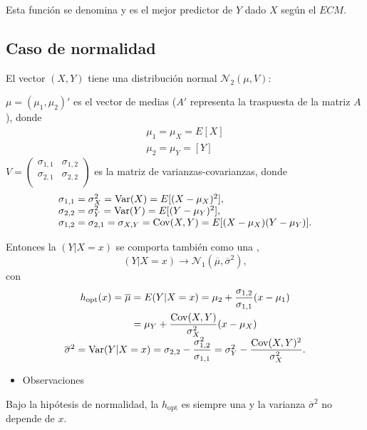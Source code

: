 Esta función se denomina  y es el mejor predictor de $Y$ dado $X$ según el $ECM$.
\subsection{Caso de normalidad}
El vector $(X,Y)$ tiene una distribución normal $\mathcal{N}_2(\mu,V)$:

$\mu=(\mu_1,\mu_2)'$ es el vector de medias ($A'$ representa la traspuesta de la matriz $A$), donde \[ \begin{array}{l}
\mu_1=\mu_X=E[X]\\
\mu_2=\mu_Y=[Y]
\end{array} \]
$V=\begin{pmatrix}
\sigma_{1,1} & \sigma_{1,2}\\
\sigma_{2,1} & \sigma_{2,2}\\
\end{pmatrix}$ es la matriz de varianzas-covarianzas, donde \[ \begin{array}{l}
\sigma_{1,1}=\sigma_X^2=\operatorname{Var}(X)=E[(X-\mu_X)^2],\\
\sigma_{2,2}=\sigma_Y^2=\operatorname{Var}(Y)=E[(Y-\mu_Y)^2],\\
\sigma_{1,2}=\sigma_{2,1}=\sigma_{X,Y}=\operatorname{Cov}(X,Y)=E[(X-\mu_X)(Y-\mu_Y)].
\end{array} \]

Entonces la  $(Y|X=x)$ se comporta también como una , \[ (Y|X=x)\longrightarrow \mathcal{N}_1(\overline{\mu},\overline{\sigma}^2), \] con \[ \begin{array}{c}
\begin{aligned}
h_{\mathrm{opt}}(x)=\overline{\mu}&=E(Y|X=x)=\mu_2+\dfrac{\sigma_{1,2}}{\sigma_{1,1}}(x-\mu_1)\\
&=\mu_Y+\dfrac{\operatorname{Cov}(X,Y)}{\sigma_X^2}(x-\mu_X)
\end{aligned}\\
\overline{\sigma}^2=\operatorname{Var}(Y|X=x)=\sigma_{2,2}-\dfrac{\sigma_{1,2}^2}{\sigma_{1,1}}=\sigma_Y^2-\dfrac{\operatorname{Cov}(X,Y)^2}{\sigma_X^2}.
\end{array} \]

\begin{itemize}[label=\color{red}\textbullet, leftmargin=*]
	\item \color{lightblue}Observaciones
\end{itemize}
Bajo la hipótesis de normalidad, la  $h_{\mathrm{opt}}$ es siempre una  y la varianza $\overline{\sigma}^2$ no depende de $x$.

